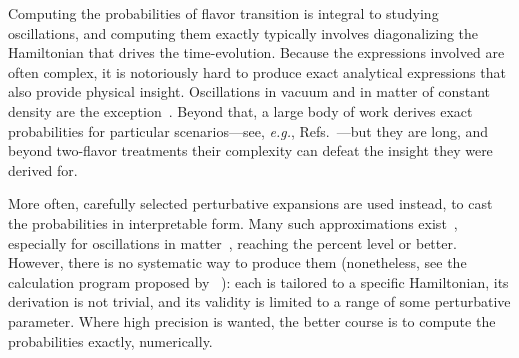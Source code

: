 \documentclass[final,5p,times,twocolumn,sort,compress]{elsarticle}
\newcommand{\eg}{{\it e.g.}}
\providecommand{\Ref}{}
\newcommand{\Refs}{Refs.}
\begin{document}
Computing the probabilities of flavor transition is integral to studying oscillations, and computing them exactly typically involves diagonalizing the Hamiltonian that drives the time-evolution.  Because the expressions involved are often complex, it is notoriously hard to produce exact analytical expressions that also provide physical insight.  Oscillations in vacuum and in matter of constant density are the exception\ \cite{Kayser:1981ye, Giunti:2007ry, Tanabashi:2018oca}.  Beyond that, a large body of work derives exact probabilities for particular scenarios---see, \eg, \Refs\ \cite{Barger:1980tf, Petcov:1987zj, Zaglauer:1988gz, TorrenteLujan:1995qi, Balantekin:1997jp, Coleman:1998ti, Gago:2001xg, Kimura:2002wd, Harrison:2003fi, Kostelecky:2003xn, Kostelecky:2003cr, GonzalezGarcia:2004wg, Blennow:2004qd, Meloni:2009ia, Ando:2009ts, Abe:2014wla, Flores:2015mah, Popov:2018seq}---but they are long, and beyond two-flavor treatments their complexity can defeat the insight they were derived for.

More often, carefully selected perturbative expansions are used instead, to cast the probabilities in interpretable form.  Many such approximations exist\ \cite{Gago:2002na, Blennow:2008eb, Diaz:2009qk, Meloni:2009ia, Chaves:2018sih}, especially for oscillations in matter\ \cite{Petcov:1986qg, Hirota:1998wv, Cervera:2000kp, Freund:2001pn, Akhmedov:2004ny, Friedland:2006pi, Ioannisian:2008ve, Supanitsky:2008eq, Minakata:2015gra, Flores:2015mah, Li:2016pzm, Denton:2016wmg, Parke:2019vbs}, reaching the percent level or better.  However, there is no systematic way to produce them (nonetheless, see the calculation program proposed by \Ref\ \cite{Denton:2018fex}): each is tailored to a specific Hamiltonian, its derivation is not trivial, and its validity is limited to a range of some perturbative parameter.  Where high precision is wanted, the better course is to compute the probabilities exactly, numerically.
\end{document}
